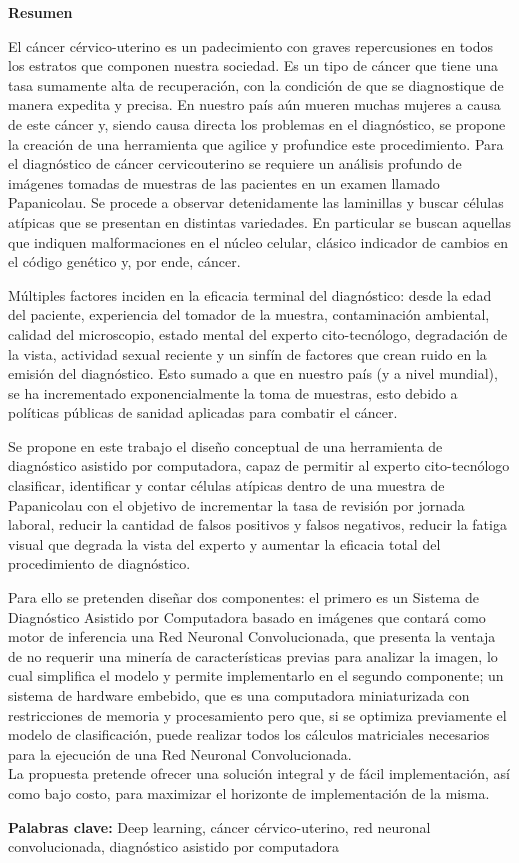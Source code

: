 \begin{center}
    \textbf{Resumen}
\end{center}
El cáncer cérvico-uterino es un padecimiento con graves repercusiones en todos
los estratos que componen nuestra sociedad. Es un tipo de cáncer que tiene una tasa
sumamente alta de recuperación, con la condición de que se diagnostique de
manera expedita y precisa. En nuestro país aún mueren muchas mujeres a causa de
este cáncer y, siendo causa directa los problemas en el diagnóstico, se propone
la creación de una herramienta que agilice y profundice este procedimiento. Para
el diagnóstico de cáncer cervicouterino se requiere un análisis profundo de
imágenes tomadas de muestras de las pacientes en un examen llamado Papanicolau.
Se procede a observar detenidamente las laminillas y buscar células atípicas que
se presentan en distintas variedades. En particular se buscan aquellas que
indiquen malformaciones en el núcleo celular, clásico indicador de cambios en el
código genético y, por ende, cáncer. 

Múltiples factores inciden en la eficacia terminal del diagnóstico: desde la
edad del paciente, experiencia del tomador de la muestra, contaminación
ambiental, calidad del microscopio, estado mental del experto cito-tecnólogo,
degradación de la vista, actividad sexual reciente y un sinfín de factores que
crean ruido en la emisión del diagnóstico. Esto sumado a que en nuestro país (y a
nivel mundial), se ha incrementado exponencialmente la toma de muestras, esto
debido a políticas públicas de sanidad aplicadas para combatir el cáncer. 

Se propone en este trabajo el diseño conceptual de una herramienta de
diagnóstico asistido por computadora, capaz de permitir al experto
cito-tecnólogo clasificar, identificar y contar células atípicas dentro de una
muestra de Papanicolau con el objetivo de incrementar la tasa de revisión por
jornada laboral, reducir la cantidad de falsos positivos y falsos negativos,
reducir la fatiga visual que degrada la vista del experto y aumentar la eficacia
total del procedimiento de diagnóstico.

Para ello se pretenden diseñar dos componentes: el primero es un Sistema de
Diagnóstico Asistido por Computadora basado en imágenes que contará como motor
de inferencia una Red Neuronal Convolucionada, que presenta la ventaja de no
requerir una minería de características previas para analizar la imagen, lo cual
simplifica el modelo y permite implementarlo en el segundo componente; un
sistema de hardware embebido, que es una computadora miniaturizada con
restricciones de memoria y procesamiento pero que, si se optimiza previamente el
modelo de clasificación, puede realizar todos los cálculos matriciales necesarios
para la ejecución de una Red Neuronal Convolucionada. \\
La propuesta pretende ofrecer una solución integral y de fácil implementación,
así como bajo costo, para maximizar el horizonte de implementación de la misma.

\textbf{Palabras clave:} Deep learning, cáncer cérvico-uterino, red neuronal
convolucionada, diagnóstico asistido por computadora